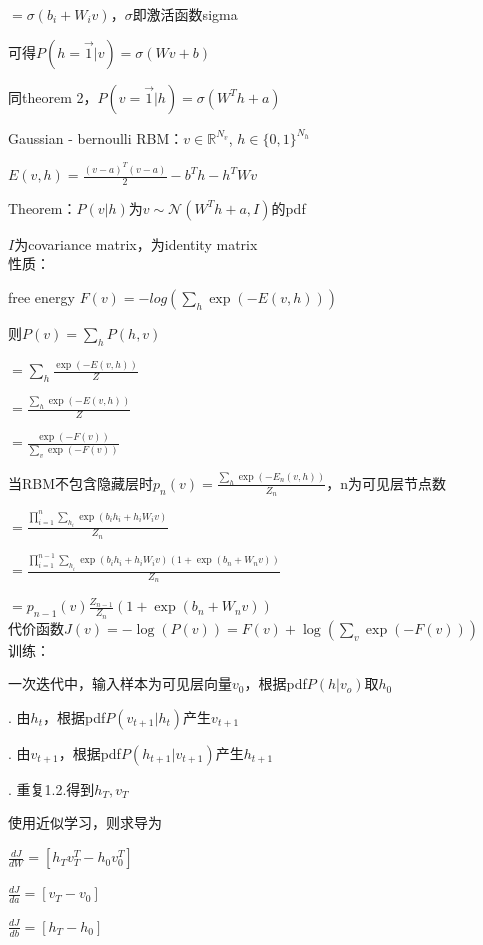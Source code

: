\documentclass[UTF8]{ctexart}
\begin{document}
  \quad \quad $ = \sigma(b_i + W_{i}v)$，$\sigma$即激活函数sigma

  \quad \quad 可得$P(h = \vec{1} | v) = \sigma(Wv + b)$

  \quad 同theorem 2，$P(v = \vec{1} | h) = \sigma(W^Th + a)$

  Gaussian - bernoulli RBM：$v \in \mathbb{R}^{N_v}$, $h \in \{0, 1\}^{N_h}$

  \quad $E(v, h) = \frac{(v - a)^T(v - a)}{2} - b^Th - h^TWv$

  \quad Theorem：$P(v | h)$为$v \sim \mathcal{N}(W^Th + a, I)$的pdf

  \quad \quad $I$为covariance matrix，为identity matrix\\
性质：

  free energy $F(v) = -log(\sum_h \exp(-E(v, h)))$

  \quad 则$P(v) = \sum_h P(h, v)$

  \quad \quad $ = \sum_h \frac{\exp(-E(v, h))}{Z}$

  \quad \quad $ = \frac{\sum_h\exp(-E(v, h))}{Z}$

  \quad \quad $ = \frac{\exp(-F(v))}{\sum_v \exp(-F(v))}$

  当RBM不包含隐藏层时$p_n(v) = \frac{\sum_h \exp(-E_n(v, h))}{Z_n}$，n为可见层节点数

  \quad $ = \frac{\prod_{i=1}^{n} \sum_{h_i} \exp(b_ih_i + h_iW_iv)}{Z_n}$

  \quad $ = \frac{\prod_{i=1}^{n - 1} \sum_{h_i} \exp(b_ih_i + h_iW_iv)(1 + \exp(b_n + W_nv))}{Z_n}$

  \quad $ = p_{n-1}(v)\frac{Z_{n-1}}{Z_n}(1 + \exp(b_n + W_nv))$\\
代价函数$J(v) = -\log(P(v)) = F(v) + \log(\sum_v\exp(-F(v)))$\\
训练： 

  一次迭代中，输入样本为可见层向量$v_0$，根据pdf$P(h | v_o)$取$h_0$

  . 由$h_t$，根据pdf$P(v_{t+1} | h_t)$产生$v_{t+1}$

  . 由$v_{t+1}$，根据pdf$P(h_{t+1} | v_{t+1})$产生$h_{t+1}$

  . 重复1.2.得到$h_T, v_T$

  \quad 使用近似学习，则求导为
  
  \quad \quad $\frac{dJ}{dW} = [h_Tv_T^T - h_0v_0^T]$

  \quad \quad $\frac{dJ}{da} = [v_T - v_0]$

  \quad \quad $\frac{dJ}{db} = [h_T - h_0]$
\end{document}
